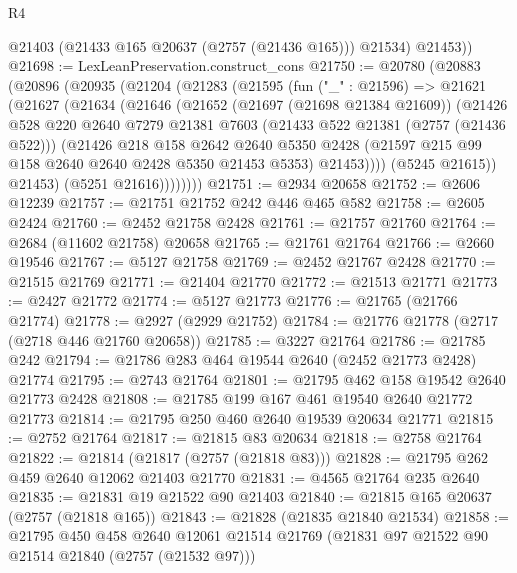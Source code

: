 \begin{lexlean}{R4}
\begin{coremodule}
          @21403
          (@21433 @165 @20637 (@2757 (@21436 @165)))
          @21534)
        @21453))
@21698 := LexLeanPreservation.construct_cons
@21750 := @20780
    (@20883
      (@20896
        (@20935
          (@21204
            (@21283
              (@21595
                (fun ("_" : @21596) =>
                @21621
                  (@21627
                    (@21634
                      (@21646
                        (@21652
                          (@21697 (@21698 @21384 @21609))
                          (@21426
                            @528
                            @220
                            @2640
                            @7279
                            @21381
                            @7603
                            (@21433 @522 @21381 (@2757 (@21436 @522)))
                            (@21426
                              @218
                              @158
                              @2642
                              @2640
                              @5350
                              @2428
                              (@21597 @215 @99 @158 @2640 @2640 @2428 @5350 @21453 @5353)
                              @21453))))
                      (@5245 @21615))
                    @21453)
                  (@5251 @21616))))))))
@21751 := @2934 @20658
@21752 := @2606 @12239
@21757 := @21751 @21752 @242 @446 @465 @582
@21758 := @2605 @2424
@21760 := @2452 @21758 @2428
@21761 := @21757 @21760
@21764 := @2684 (@11602 @21758) @20658
@21765 := @21761 @21764
@21766 := @2660 @19546
@21767 := @5127 @21758
@21769 := @2452 @21767 @2428
@21770 := @21515 @21769
@21771 := @21404 @21770
@21772 := @21513 @21771
@21773 := @2427 @21772
@21774 := @5127 @21773
@21776 := @21765 (@21766 @21774)
@21778 := @2927 (@2929 @21752)
@21784 := @21776 @21778 (@2717 (@2718 @446 @21760 @20658))
@21785 := @3227 @21764
@21786 := @21785 @242
@21794 := @21786 @283 @464 @19544 @2640 (@2452 @21773 @2428) @21774
@21795 := @2743 @21764
@21801 := @21795 @462 @158 @19542 @2640 @21773 @2428
@21808 := @21785 @199 @167 @461 @19540 @2640 @21772 @21773
@21814 := @21795 @250 @460 @2640 @19539 @20634 @21771
@21815 := @2752 @21764
@21817 := @21815 @83 @20634
@21818 := @2758 @21764
@21822 := @21814 (@21817 (@2757 (@21818 @83)))
@21828 := @21795 @262 @459 @2640 @12062 @21403 @21770
@21831 := @4565 @21764 @235 @2640
@21835 := @21831 @19 @21522 @90 @21403
@21840 := @21815 @165 @20637 (@2757 (@21818 @165))
@21843 := @21828 (@21835 @21840 @21534)
@21858 := @21795
    @450
    @458
    @2640
    @12061
    @21514
    @21769
    (@21831 @97 @21522 @90 @21514 @21840 (@2757 (@21532 @97)))

\end{coremodule}
\end{lexlean}
